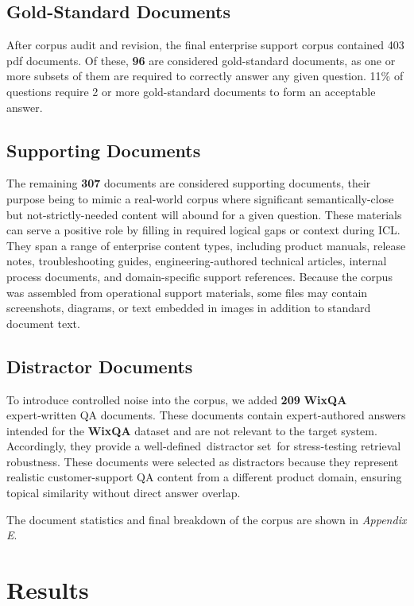 \documentclass[11pt]{article}
\begin{document}
\subsection{Gold-Standard Documents}

After corpus audit and revision, the final enterprise support corpus
contained 403 pdf documents. Of these, \textbf{96} are considered
gold-standard
documents, as one or more subsets of them are required to correctly answer
any given question. 11\% of questions require 2 or more
gold-standard documents to form an acceptable answer.

\subsection{Supporting Documents}

The remaining \textbf{307} documents are considered supporting
documents, their purpose being to mimic a real-world corpus where significant
semantically-close but not-strictly-needed content will abound for a
given question. These materials can serve a positive role by filling in
required logical gaps or context during ICL. They span a range of
enterprise content types, including product manuals, release notes,
troubleshooting guides, engineering-authored technical articles,
internal process documents, and domain-specific support references.
Because the corpus was assembled from operational support materials,
some files may contain screenshots, diagrams, or text embedded in images
in addition to standard document text.

\subsection{Distractor Documents}

To introduce controlled noise into the corpus, we added \textbf{209}
\textbf{WixQA} expert‑written QA documents. These documents contain
expert‑authored answers intended for the \textbf{WixQA} dataset and are not
relevant to the target system. Accordingly, they provide a
well‑defined~distractor set~for stress‑testing retrieval robustness.
These documents were selected as distractors because they represent
realistic customer-support QA content from a different product domain,
ensuring topical similarity without direct answer overlap.

The document statistics and final breakdown of the corpus are shown in \textit{Appendix E}.

\section{Results}
\end{document}
